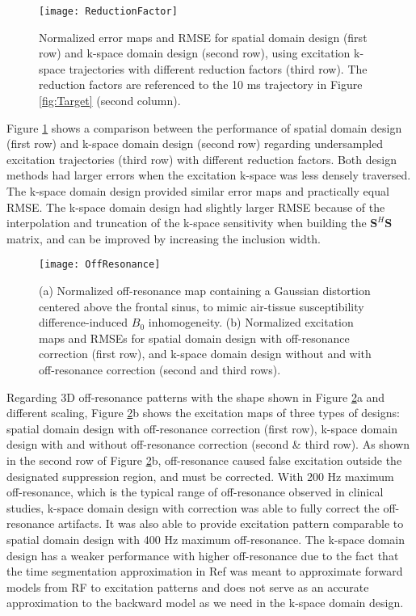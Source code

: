 \begin{figure}
	\centering
	\texttt{[image: ReductionFactor]}
	\caption{Normalized error maps and RMSE for spatial domain design (first row) and k-space domain design (second row), 
	using excitation k-space trajectories with different reduction factors (third row).
	The reduction factors are referenced to the 10 ms trajectory in Figure \ref{fig:Target} (second column).}
	\label{fig:kspace_PTX_Acceleration}
\end{figure}

Figure \ref{fig:kspace_PTX_Acceleration} shows a comparison between the performance of spatial domain design (first row) and k-space domain design (second row) regarding undersampled excitation trajectories (third row) with different reduction factors. Both design methods had larger errors when the excitation k-space was less densely traversed. The k-space domain design provided similar error maps and practically equal RMSE. The k-space domain design had slightly larger RMSE because of the interpolation and truncation of the k-space sensitivity when building the $\mathbf{S}^{H}\mathbf{S}$ matrix, and can be improved by increasing the inclusion width. 


\begin{figure}
	\centering
	\texttt{[image: OffResonance]}
	\caption{
	(a) Normalized off-resonance map containing a Gaussian distortion centered above the frontal sinus, 
	to mimic air-tissue susceptibility difference-induced $B_0$ inhomogeneity.
	(b) Normalized excitation maps and RMSEs for spatial domain design with off-resonance correction (first row), 
	and k-space domain design without and with off-resonance correction (second and third rows).}
	\label{fig:kspace_PTX_B0}
\end{figure}

Regarding 3D off-resonance patterns with the shape shown in Figure \ref{fig:kspace_PTX_B0}a and different scaling, Figure \ref{fig:kspace_PTX_B0}b shows the excitation maps of three types of designs: spatial domain design with off-resonance correction (first row), k-space domain design with and without off-resonance correction (second \& third row). As shown in the second row of Figure \ref{fig:kspace_PTX_B0}b, off-resonance caused false excitation outside the designated suppression region, and must be corrected. With 200 Hz maximum off-resonance, which is the typical range of off-resonance observed in clinical studies, k-space domain design with correction was able to fully correct the off-resonance artifacts. It was also able to provide excitation pattern comparable to spatial domain design with 400 Hz maximum off-resonance. The k-space domain design has a weaker performance with higher off-resonance due to the fact that the time segmentation approximation in Ref \cite{fessler2005toeplitz} was meant to approximate forward models from RF to excitation patterns and does not serve as an accurate approximation to the backward model as we need in the k-space domain design.